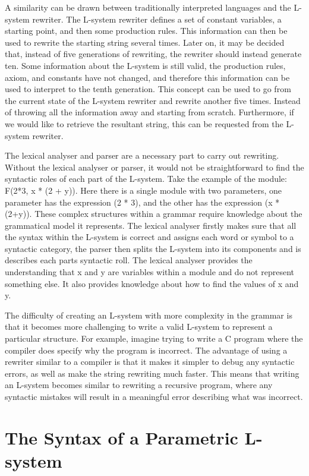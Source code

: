 A similarity can be drawn between traditionally interpreted languages and the L-system rewriter. The L-system rewriter defines a set of constant variables, a starting point, and then some production rules. This information can then be used to rewrite the starting string several times. Later on, it may be decided that, instead of five generations of rewriting, the rewriter should instead generate ten. Some information about the L-system is still valid, the production rules, axiom, and constants have not changed, and therefore this information can be used to interpret to the tenth generation. This concept can be used to go from the current state of the L-system rewriter and rewrite another five times. Instead of throwing all the information away and starting from scratch. Furthermore, if we would like to retrieve the resultant string, this can be requested from the L-system rewriter. 

The lexical analyser and parser are a necessary part to carry out rewriting. Without the lexical analyser or parser, it would not be straightforward to find the syntactic roles of each part of the L-system. Take the example of the module: F(2*3, x * (2 + y)). Here there is a single module with two parameters, one parameter has the expression (2 * 3), and the other has the expression (x * (2+y)). These complex structures within a grammar require knowledge about the grammatical model it represents. The lexical analyser firstly makes sure that all the syntax within the L-system is correct and assigns each word or symbol to a syntactic category, the parser then splits the L-system into its components and is describes each parts syntactic roll. The lexical analyser provides the understanding that x and y are variables within a module and do not represent something else. It also provides knowledge about how to find the values of x and y. 

The difficulty of creating an L-system with more complexity in the grammar is that it becomes more challenging to write a valid L-system to represent a particular structure. For example, imagine trying to write a C program where the compiler does specify why the program is incorrect. The advantage of using a rewriter similar to a compiler is that it makes it simpler to debug any syntactic errors, as well as make the string rewriting much faster. This means that writing an L-system becomes similar to rewriting a recursive program, where any syntactic mistakes will result in a meaningful error describing what was incorrect.

\section{The Syntax of a Parametric L-system}

